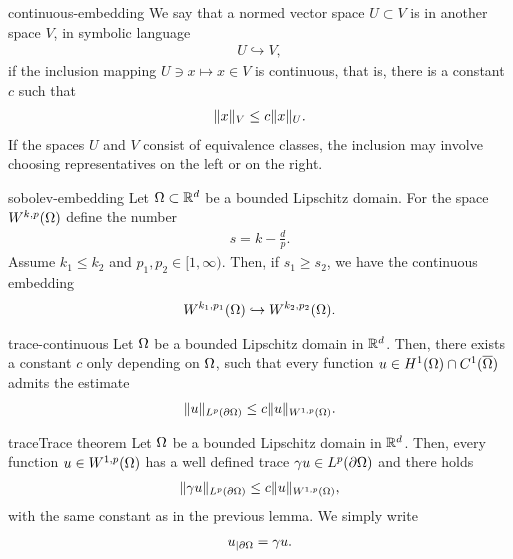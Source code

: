 \begin{Definition}{continuous-embedding}
  We say that a normed vector space $U \subset V$ is
   in another space $V$, in symbolic
  language
  \begin{gather}
    U \hookrightarrow V,
  \end{gather}
  if the inclusion mapping $U \ni x \mapsto x\in V$ is continuous, that is, there is a constant $c$ such that
  \begin{gather}
    \lVert x\rVert_V \le c \lVert x\rVert_U.
  \end{gather}
  If the spaces $U$ and $V$ consist of equivalence classes, the
  inclusion may involve choosing representatives on the left or on the
  right.
\end{Definition}

\begin{Theorem}{sobolev-embedding}
  Let $\Omega\subset\mathbb R^d$ be a bounded Lipschitz domain. For the space
  $W^{k,p}(\Omega)$ define the number
  \begin{gather}
    s = k-\tfrac dp.
  \end{gather} Assume $k_1 \le k_2$ and $p_1,p_2\in [1,\infty)$.
  Then, if $s_1 \ge s_2$, we have the continuous embedding
  \begin{gather}
    W^{k_1,p_1}(\Omega) \hookrightarrow  W^{k_2,p_2}(\Omega).
  \end{gather}
\end{Theorem}

\begin{Lemma}{trace-continuous}
  Let $\Omega$ be a bounded Lipschitz domain in $\mathbb R^d$. Then, there
  exists a constant $c$ only depending on $\Omega$, such that every
  function $u\in H^1(\Omega) \cap C^1(\overline{\Omega})$ admits the
  estimate
  \begin{gather}
    \lVert u\rVert_{L^p(\partial\Omega)} \le c \lVert u\rVert_{W^{1,p}(\Omega)}.
  \end{gather}
\end{Lemma}

\begin{Theorem*}{trace}{Trace theorem}
  Let $\Omega$ be a bounded Lipschitz domain in $\mathbb R^d$. Then, every
  function $u\in W^{1,p}(\Omega)$ has a well defined trace
  $\gamma u \in L^p(\partial\Omega)$ and there holds
  \begin{gather}
    \lVert\gamma u\rVert_{L^p(\partial\Omega)} \le c \lVert u\rVert_{W^{1,p}(\Omega)},
  \end{gather}
  with the same constant as in the previous lemma. We simply write
  \begin{gather}
    u_{|\partial\Omega} = \gamma u.
  \end{gather}
\end{Theorem*}

